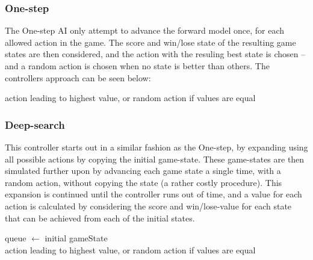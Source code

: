 \documentclass[a4paper,titlepage,final]{report}
\begin{document}
\subsubsection*{One-step}
The One-step AI only attempt to advance the forward model once, for each allowed action in the game.
The score and win/lose state of the resulting game states are then considered, and the action with the resuling best state is chosen -- and a random action is chosen when no state is better than others.
The controllers approach can be seen below:

\begin{algorithm}[H]
\Return action leading to highest value, or random action if values are equal
\end{algorithm}

\subsubsection*{Deep-search}
This controller starts out in a similar fashion as the One-step, by expanding using all possible actions by copying the initial game-state.
These game-states are then simulated further upon by advancing each game state a single time, with a random action, without copying the state (a rather costly procedure).
This expansion is continued until the controller runs out of time, and a value for each action is calculated by considering the score and win/lose-value for each state that can be achieved from each of the initial states.

\begin{algorithm}[H]
queue $\gets$ initial gameState \\
\Return action leading to highest value, or random action if values are equal
\end{algorithm}
\end{document}
